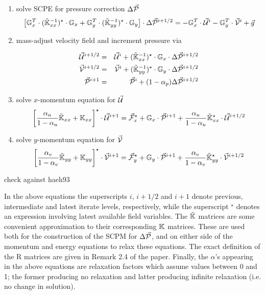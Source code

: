 \documentclass[a4paper,12pt]{article}
\begin{document}
\begin{enumerate}
\item solve SCPE for pressure correction $\Delta \vec{\cal P}$
\[
\left[
{\mathbb{G}}_x^T \cdot ( \tilde{{\mathbb{K}}}_{xx}^{-1})^\star \cdot {\mathbb{G}}_x
+
{\mathbb{G}}_y^T \cdot ( \tilde{{\mathbb{K}}}_{yy}^{-1})^\star \cdot {\mathbb{G}}_y
\right]
\cdot
\Delta \vec{\cal P}^{i+1/2} 
= -{\mathbb{G}}_x^T \cdot \vec{\cal U}^i - {\mathbb{G}}_y^T \cdot \vec{\cal V}^i + \vec{g} 
\]

\item mass-adjust velocity field and increment pressure via

\begin{eqnarray}
\vec{\cal U}^{i+1/2} &=& \vec{\cal U}^i + (\tilde{{\mathbb{K}}}_{xx}^{-1})^\star \cdot 
{\mathbb{G}}_x \cdot \Delta \vec{\cal P}^{i+1/2} \\
\vec{\cal V}^{i+1/2} &=& \vec{\cal V}^i + (\tilde{{\mathbb{K}}}_{yy}^{-1})^\star \cdot 
{\mathbb{G}}_y \cdot \Delta \vec{\cal P}^{i+1/2} \\
\vec{\cal P}^{i+1} &=& \vec{\cal P}^i + (1-\alpha_p) \Delta \vec{\cal P}^{i+1/2}
\end{eqnarray}

\item solve $x$-momentum equation for $\vec{\cal U}$
\[
\left[
\frac{\alpha_u}{1-\alpha_u} \tilde{{\mathbb{K}}}_{xx} + {\mathbb{K}}_{xx}
\right]^\star
\cdot
\vec{\cal U}^{i+1} = \vec{\cal F}_x^\star + {\mathbb{G}}_x \cdot \vec{\cal P}^{i+1}
+\frac{\alpha_u}{1-\alpha_u} \tilde{{\mathbb{K}}}_{xx}^\star\cdot \vec{\cal U}^{i+1/2}
\]
\item solve $y$-momentum equation for $\vec{\cal V}$
\[
\left[
\frac{\alpha_v}{1-\alpha_v} \tilde{{\mathbb{K}}}_{yy} + {\mathbb{K}}_{yy}
\right]^\star
\cdot
\vec{\cal V}^{i+1} = \vec{\cal F}_y^\star + {\mathbb{G}}_y \cdot \vec{\cal P}^{i+1}
+\frac{\alpha_v}{1-\alpha_v} \tilde{{\mathbb{K}}}_{yy}^\star\cdot \vec{\cal V}^{i+1/2}
\]
\end{enumerate}

{\color{red} check against haeh93}

In the above equations the superscripts $i$, $i+1/2$ and $i+1$ 
denote previous, intermediate and latest iterate levels, respectively, 
while the superscript $^\star$ denotes an expression involving latest
available field variables. The $\tilde{{\mathbb{K}}}$ matrices are some convenient 
approximation to their corresponding ${\mathbb{K}}$ matrices. These are used both 
for the construction of the SCPM for $\Delta \vec{\cal P}$, and on either side of
the momentum and energy equations to relax these equations. 
The exact definition of the R matrices are given in Remark 2.4 of the paper. 
Finally, the $\alpha$'s appearing in the above equations are
relaxation factors which assume values between 0 and 1; 
the former producing no relaxation and
latter producing infinite relaxation (i.e. no change in solution).
\end{document}
